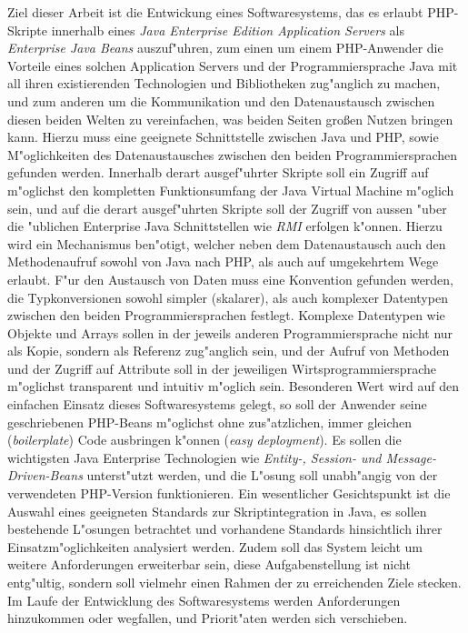 Ziel dieser Arbeit ist die Entwickung eines Softwaresystems, das es erlaubt PHP-Skripte innerhalb eines 
\emph{Java Enterprise Edition Application Servers} als \emph{Enterprise Java Beans} auszuf"uhren, zum einen
um einem PHP-Anwender die Vorteile eines solchen Application Servers und der Programmiersprache Java mit
all ihren existierenden Technologien und Bibliotheken zug"anglich zu machen, und zum anderen um die
Kommunikation und den Datenaustausch zwischen diesen beiden Welten zu vereinfachen, was beiden Seiten
gro\ss en Nutzen bringen kann.
Hierzu muss eine geeignete Schnittstelle zwischen Java und PHP, sowie M"oglichkeiten des Datenaustausches zwischen
den beiden Programmiersprachen gefunden werden. Innerhalb derart ausgef"uhrter Skripte soll ein Zugriff auf
m"oglichst den kompletten Funktionsumfang der Java Virtual Machine m"oglich sein, und
auf die derart ausgef"uhrten Skripte soll der Zugriff von aussen "uber
die "ublichen Enterprise Java Schnittstellen wie \emph{RMI} erfolgen k"onnen. Hierzu wird ein Mechanismus ben"otigt,
welcher neben dem Datenaustausch auch den Methodenaufruf sowohl von Java nach PHP, als auch auf umgekehrtem Wege 
erlaubt. F"ur den Austausch von Daten muss eine Konvention gefunden werden, die Typkonversionen sowohl simpler (skalarer),
als auch komplexer Datentypen zwischen den beiden Programmiersprachen festlegt. Komplexe Datentypen wie Objekte und
Arrays sollen in der jeweils anderen Programmiersprache nicht nur als Kopie, sondern als Referenz zug"anglich sein,
und der Aufruf von Methoden und der Zugriff auf Attribute soll in der jeweiligen Wirtsprogrammiersprache m"oglichst 
transparent und intuitiv m"oglich sein.
Besonderen Wert wird auf den einfachen Einsatz dieses Softwaresystems gelegt, so soll der Anwender
seine geschriebenen PHP-Beans m"oglichst ohne zus"atzlichen, immer gleichen (\emph{boilerplate}) Code ausbringen
k"onnen (\emph{easy deployment}). Es sollen die wichtigsten Java Enterprise Technologien wie
\emph{Entity-, Session- und Message-Driven-Beans} unterst"utzt werden, und die L"osung soll unabh"angig von der
verwendeten PHP-Version funktionieren. Ein wesentlicher Gesichtspunkt ist die Auswahl eines geeigneten Standards
zur Skriptintegration in Java, es sollen bestehende L"osungen betrachtet und vorhandene Standards hinsichtlich ihrer
Einsatzm"oglichkeiten analysiert werden.
Zudem soll das System leicht um weitere Anforderungen erweiterbar sein, diese Aufgabenstellung ist nicht entg"ultig,
sondern soll vielmehr einen Rahmen der zu erreichenden Ziele stecken. Im Laufe der Entwicklung des Softwaresystems werden
Anforderungen hinzukommen oder wegfallen, und Priorit"aten werden sich verschieben.

